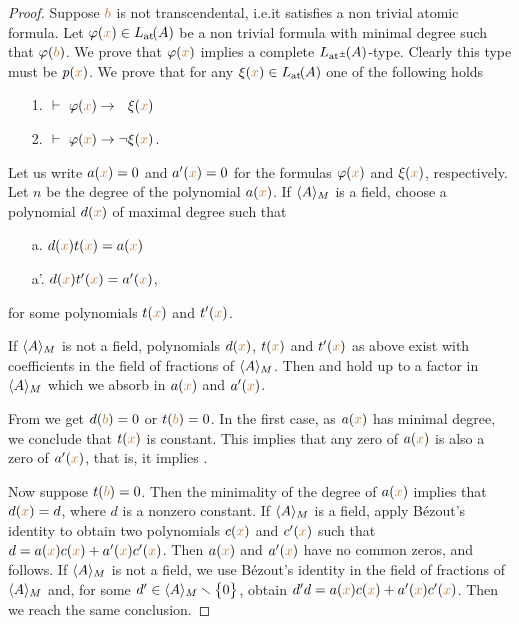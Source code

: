 \documentclass[creche.tex]{subfiles}
\begin{document}
\begin{proof}
Suppose ${\color{brown} b}$ is not transcendental, i.e.\@ it satisfies a non trivial atomic formula. Let $\varphi({\color{brown} x})\in L_{\tiny\rm at}\hskip-.3ex(A)$ be a non trivial formula with minimal degree such that $\varphi({\color{brown} b})$.  We prove that $\varphi({\color{brown} x})$ implies a complete $L_{{\tiny\rm at^\pm}}\hskip-.3ex(A)$-type.  Clearly this type must be $p({\color{brown} x})$. We prove that for any $\xi({\color{brown} x})\in L_{\tiny\rm at}\hskip-.3ex(A)$ one of the following holds
\begin{itemize}
\item[1.] $\ \proves\ \phi({\mr x})\imp\phantom{\neg}\xi({\mr x})$
\item[2.] $\ \proves\ \phi({\mr x})\imp\neg\xi({\mr x})$.
\end{itemize} 
Let us write $a({\color{brown} x})=0$ and $a'({\color{brown} x})=0$ for the formulas $\varphi({\color{brown} x})$ and $\xi({\color{brown} x})$, respectively. Let $n$ be the degree of the polynomial $a({\color{brown} x})$. If $\langle A\rangle_M$ is a field, choose a polynomial $d({\color{brown} x})$ of maximal degree such that
\begin{itemize}
\item[a.] $d({\color{brown} x})t({\color{brown} x})=a({\color{brown} x})$
\item[a'.] $d({\color{brown} x})t'({\color{brown} x})=a'({\color{brown} x})$,
\end{itemize} 
for some polynomials $t({\color{brown} x})$ and $t'({\color{brown} x})$. 

If $\langle A\rangle_M$ is not a field, polynomials $d({\color{brown} x})$, $t({\color{brown} x})$ and $t'({\color{brown} x})$ as above exist with coefficients in the field of fractions of $\langle A\rangle_M$. Then  and  hold up to a factor in $\langle A\rangle_M$ which we absorb in $a({\color{brown} x})$ and $a'({\color{brown} x})$. 

From  we get $d({\color{brown} b})=0$ or $t({\color{brown} b})=0$. In the first case, as $a({\color{brown} x})$ has minimal degree, we conclude that $t({\color{brown} x})$ is constant.  This implies that any zero of $a({\color{brown} x})$ is also a zero of $a'({\color{brown} x})$, that is, it implies . 

Now suppose $t({\color{brown} b})=0$. Then the minimality of the degree of $a({\color{brown} x})$ implies that $d({\color{brown} x})=d$, where $d$ is a nonzero constant. If $\langle A\rangle_M$ is a field, apply B\'ezout's identity to obtain two polynomials $c({\color{brown} x})$ and $c'({\color{brown} x})$ such that $d=a({\color{brown} x})c({\color{brown} x})+a'({\color{brown} x})c'({\color{brown} x})$. Then $a({\color{brown} x})$ and $a'({\color{brown} x})$ have no common zeros, and  follows. If $\langle A\rangle_M$ is not a field, we use  B\'ezout's identity in the field of fractions of $\langle A\rangle_M$ and, for some $d'\in\langle A\rangle_M\smallsetminus\big\{0\big\}$, obtain $d'd=a({\color{brown} x})c({\color{brown} x})+a'({\color{brown} x})c'({\color{brown} x})$. Then we reach the same conclusion.
\end{proof}
\end{document}
